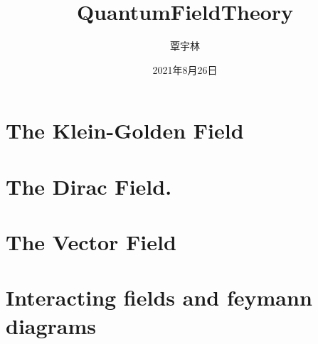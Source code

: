 








\setlength{\droptitle}{-2cm}
\pretitle{\begin{center}\LARGE\sffamily}
\title{QuantumFieldTheory}
\posttitle{\par\end{center}\vspace{-0.3cm}}
\preauthor{\large}
\DeclareRobustCommand{\authorthing}
{
\begin{center}
\begin{tabular}{c}%
覃宇林\\
\end{tabular}
\end{center}
}
\author{\authorthing}
\postauthor{}
\predate{\begin{center}\large\scshape}
\date{2021年8月26日}
\postdate{\par\end{center}}


\frontpagestyle
\maketitle
{}
\tableofcontents\newpage
{}
\mainpagestyle
\setcounter{page}{1}
\section{The Klein-Golden Field}


\section{The Dirac Field.}


\section{The Vector Field}


\section{Interacting fields and feymann diagrams}



